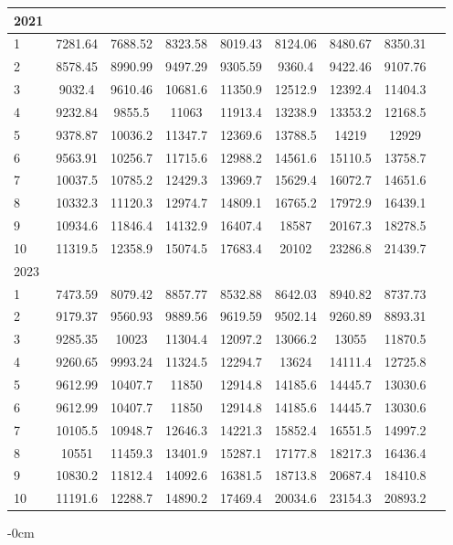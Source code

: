 \documentclass[jimaging,article,submit,pdftex,moreauthors]{Definitions/mdpi}
\begin{document}
\begin{longtable}{@{\extracolsep{\fill}}p{1.5cm}cccccccc@{}}
2021 &  &  &  & & & & \\
\hline
1 & 7281.64 & 7688.52 & 8323.58 & 8019.43 & 8124.06 & 8480.67 & 8350.31 \\
2 & 8578.45 & 8990.99 & 9497.29 & 9305.59 & 9360.4 & 9422.46 & 9107.76 \\
3 & 9032.4 & 9610.46 & 10681.6 & 11350.9 & 12512.9 & 12392.4 & 11404.3 \\
4 & 9232.84 & 9855.5 & 11063 & 11913.4 & 13238.9 & 13353.2 & 12168.5 \\
5 & 9378.87 & 10036.2 & 11347.7 & 12369.6 & 13788.5 & 14219 & 12929 \\
6 & 9563.91 & 10256.7 & 11715.6 & 12988.2 & 14561.6 & 15110.5 & 13758.7 \\
7 & 10037.5 & 10785.2 &12429.3 & 13969.7 & 15629.4 & 16072.7 & 14651.6 \\
8 & 10332.3 & 11120.3 & 12974.7 & 14809.1 & 16765.2 & 17972.9 & 16439.1 \\
9 & 10934.6 & 11846.4 & 14132.9 & 16407.4 & 18587 & 20167.3 & 18278.5 \\
10 & 11319.5 & 12358.9 & 15074.5 & 17683.4 & 20102 & 23286.8 & 21439.7 \\
\hline
2023 &  &  &  & & & & \\
\hline
1 & 7473.59 & 8079.42 & 8857.77 & 8532.88 & 8642.03 & 8940.82 & 8737.73 \\
2 & 9179.37 & 9560.93 & 9889.56 & 9619.59 & 9502.14 & 9260.89 & 8893.31 \\
3 & 9285.35 & 10023 & 11304.4 & 12097.2 & 13066.2 & 13055 & 11870.5 \\
4 & 9260.65 & 9993.24 & 11324.5 & 12294.7 & 13624 & 14111.4 & 12725.8 \\
5 & 9612.99 & 10407.7 & 11850 & 12914.8 & 14185.6 & 14445.7 & 13030.6 \\
6 & 9612.99 & 10407.7 & 11850 & 12914.8 & 14185.6 & 14445.7 & 13030.6 \\
7 & 10105.5 & 10948.7 & 12646.3 & 14221.3 & 15852.4 & 16551.5 & 14997.2 \\
8 & 10551 & 11459.3 & 13401.9 & 15287.1 & 17177.8 & 18217.3 & 16436.4 \\
9 & 10830.2 & 11812.4 & 14092.6 & 16381.5 & 18713.8 & 20687.4 & 18410.8 \\
10 & 11191.6 & 12288.7 & 14890.2 & 17469.4 & 20034.6 & 23154.3 & 20893.2 \\
\hline
\end{longtable}

\begin{adjustwidth}{-\extralength}{0cm}




\end{adjustwidth}
\end{document}

